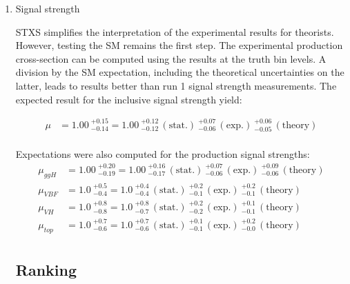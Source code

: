 \begin{enumerate}

\item Signal strength
\label{sec:orgc349fef}

STXS simplifies the interpretation of the experimental results for theorists.
However, testing the SM remains the first step.
The experimental production cross-section can be computed using the results at the truth bin levels.
A division by the SM expectation, including the theoretical uncertainties on the latter, leads to results better than run 1 signal strength measurements.
The expected result for the inclusive signal strength yield:

\begin{align*}
\mu &= 1.00\ ^{+0.15}_{-0.14} = 1.00\ ^{+0.12}_{-0.12}\,\mathrm{(stat.)}\ ^{+0.07}_{-0.06}\,\mathrm{(exp.)}\ ^{+0.06}_{-0.05}\,\mathrm{(theory)}\\
\end{align*}

Expectations were also computed for the production signal strengths:
\begin{align*}
\mu_{ggH} &= 1.00\ ^{+0.20}_{-0.19} = 1.00\ ^{+0.16}_{-0.17}\,\mathrm{(stat.)}\ ^{+0.07}_{-0.06}\,\mathrm{(exp.)}\ ^{+0.09}_{-0.06}\,\mathrm{(theory)}\\
\mu_{VBF} &= 1.0\ ^{+0.5}_{-0.4} = 1.0\ ^{+0.4}_{-0.4}\,\mathrm{(stat.)}\ ^{+0.2}_{-0.1}\,\mathrm{(exp.)}\ ^{+0.2}_{-0.1}\,\mathrm{(theory)}\\
\mu_{VH} &= 1.0\ ^{+0.8}_{-0.8} = 1.0\ ^{+0.8}_{-0.7}\,\mathrm{(stat.)}\ ^{+0.2}_{-0.2}\,\mathrm{(exp.)}\ ^{+0.1}_{-0.1}\,\mathrm{(theory)}\\
\mu_{top} &= 1.0\ ^{+0.7}_{-0.6} = 1.0\ ^{+0.7}_{-0.6}\,\mathrm{(stat.)}\ ^{+0.1}_{-0.1}\,\mathrm{(exp.)}\ ^{+0.2}_{-0.0}\,\mathrm{(theory)}\\
\end{align*}


\subsection{Ranking}
\label{sec:orge5a0462}


\end{enumerate}
